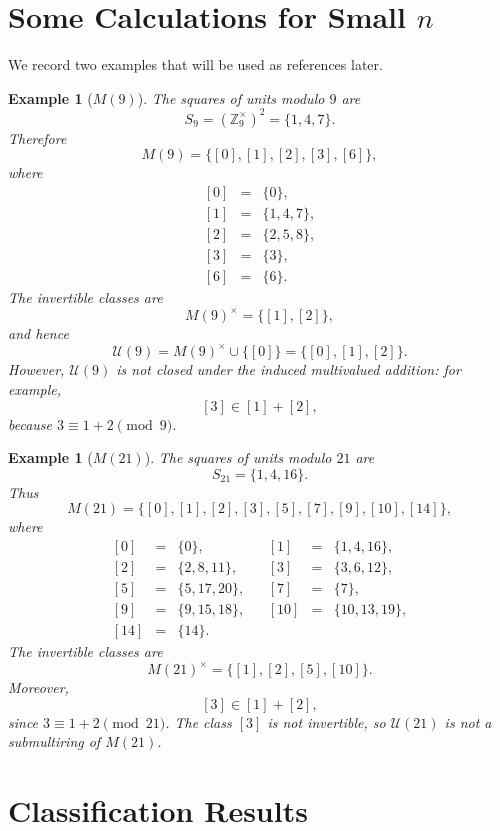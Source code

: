 \documentclass[a4paper,10pt]{article}
\newtheorem{ex}[teo]{Example}
\newcommand{\cl}[1]{\left[#1\right]}
\newcommand{\U}{\mathcal U}
\begin{document}
\section{Some Calculations for Small $n$}\label{small-section}

We record two examples that will be used as references later.

\begin{ex}[$M(9)$]\label{ex:M9}
The squares of units modulo $9$ are
\[
        S_9=(\mathbb Z_9^\times)^2=\{1,4,7\}.
\]
Therefore
\[
        M(9)=\{\cl0,\cl1,\cl2,\cl3,\cl6\},
\]
where
\[
\begin{array}{rcl}
\cl0&=&\{0\},\\
\cl1&=&\{1,4,7\},\\
\cl2&=&\{2,5,8\},\\
\cl3&=&\{3\},\\
\cl6&=&\{6\}.
\end{array}
\]
The invertible classes are
\[
        M(9)^\times=\{\cl1,\cl2\},
\]
and hence
\[
        \U(9)=M(9)^\times\cup\{\cl0\}=\{\cl0,\cl1,\cl2\}.
\]
However, $\U(9)$ is not closed under the induced multivalued addition: for example,
\[
        \cl3\in\cl1+\cl2,
\]
because $3\equiv1+2\pmod9$.
\end{ex}

\begin{ex}[$M(21)$]\label{ex:M21}
The squares of units modulo $21$ are
\[
        S_{21}=\{1,4,16\}.
\]
Thus
\[
        M(21)=\{\cl0,\cl1,\cl2,\cl3,\cl5,\cl7,\cl9,\cl{10},\cl{14}\},
\]
where
\[
\begin{array}{rclcrcl}
\cl0&=&\{0\},       && \cl1&=&\{1,4,16\},\\
\cl2&=&\{2,8,11\},  && \cl3&=&\{3,6,12\},\\
\cl5&=&\{5,17,20\}, && \cl7&=&\{7\},\\
\cl9&=&\{9,15,18\}, && \cl{10}&=&\{10,13,19\},\\
\cl{14}&=&\{14\}.&&&
\end{array}
\]
The invertible classes are
\[
        M(21)^\times=\{\cl1,\cl2,\cl5,\cl{10}\}.
\]
Moreover,
\[
        \cl3\in\cl1+\cl2,
\]
since $3\equiv1+2\pmod{21}$.  The class $\cl3$ is not invertible, so $\U(21)$ is not a submultiring of $M(21)$.
\end{ex}

\section{Classification Results}\label{classification-section}
\end{document}
